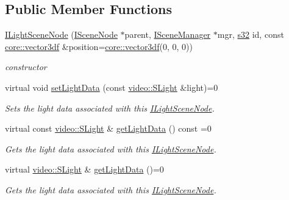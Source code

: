 \subsection*{Public Member Functions}
\begin{DoxyCompactItemize}
\item 
\mbox{\label{classirr_1_1scene_1_1ILightSceneNode_aa13c236d797d731c1035820a909ba961}} 
\hyperlink{classirr_1_1scene_1_1ILightSceneNode_aa13c236d797d731c1035820a909ba961}{I\+Light\+Scene\+Node} (\hyperlink{classirr_1_1scene_1_1ISceneNode}{I\+Scene\+Node} $\ast$parent, \hyperlink{classirr_1_1scene_1_1ISceneManager}{I\+Scene\+Manager} $\ast$mgr, \hyperlink{namespaceirr_ac66849b7a6ed16e30ebede579f9b47c6}{s32} id, const \hyperlink{namespaceirr_1_1core_ae6e2b2a6c552833ebbd5b7463d03586b}{core\+::vector3df} \&position=\hyperlink{namespaceirr_1_1core_ae6e2b2a6c552833ebbd5b7463d03586b}{core\+::vector3df}(0, 0, 0))
\begin{DoxyCompactList}\small\item\em constructor \end{DoxyCompactList}\item 
virtual void \hyperlink{classirr_1_1scene_1_1ILightSceneNode_acf74ff3400a26ae31eb96b9c479e62d5}{set\+Light\+Data} (const \hyperlink{structirr_1_1video_1_1SLight}{video\+::\+S\+Light} \&light)=0
\begin{DoxyCompactList}\small\item\em Sets the light data associated with this \hyperlink{classirr_1_1scene_1_1ILightSceneNode}{I\+Light\+Scene\+Node}. \end{DoxyCompactList}\item 
virtual const \hyperlink{structirr_1_1video_1_1SLight}{video\+::\+S\+Light} \& \hyperlink{classirr_1_1scene_1_1ILightSceneNode_a687813feae9312a86882e12c2bd10194}{get\+Light\+Data} () const =0
\begin{DoxyCompactList}\small\item\em Gets the light data associated with this \hyperlink{classirr_1_1scene_1_1ILightSceneNode}{I\+Light\+Scene\+Node}. \end{DoxyCompactList}\item 
virtual \hyperlink{structirr_1_1video_1_1SLight}{video\+::\+S\+Light} \& \hyperlink{classirr_1_1scene_1_1ILightSceneNode_a20147e049be1a4790346fd72b150b30c}{get\+Light\+Data} ()=0
\begin{DoxyCompactList}\small\item\em Gets the light data associated with this \hyperlink{classirr_1_1scene_1_1ILightSceneNode}{I\+Light\+Scene\+Node}. \end{DoxyCompactList}\item 

\end{DoxyCompactItemize}

